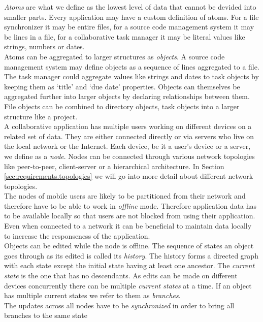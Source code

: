 \emph{Atoms} are what we define as the lowest level of data that cannot be devided into smaller parts.
Every application may have a custom definition of atoms.
For a file synchronizer it may be entire files, for a source code management system it may be lines in a file, for a collaborative task manager it may be literal values like strings, numbers or dates.\\
Atoms can be aggregated to larger structures as \emph{objects}.
A source code management system may define objects as a sequence of lines aggregated to a file.
The task manager could aggregate values like strings and dates to task objects by keeping them as `title' and `due date' properties.
Objects can themselves be aggregated further into larger objects by declaring relationships between them.
File objects can be combined to directory objects, task objects into a larger structure like a project.\\
A collaborative application has multiple users working on different devices on a related set of data.
They are either connected directly or via servers who live on the local network or the Internet.
Each device, be it a user's device or a server, we define as a \emph{node}.
Nodes can be connected through various network topologies like peer-to-peer, client-server or a hierarchical architecture.
In Section \ref{sec:requirements.topologies} we will go into more detail about different network topologies.\\
The nodes of mobile users are likely to be partitioned from their network and therefore have to be able to work in \emph{offline} mode.
Therefore application data has to be available locally so that users are not blocked from using their application.
Even when connected to a network it can be beneficial to maintain data locally to increase the responseness of the application.\\
Objects can be edited while the node is offline.
The sequence of states an object goes through as its edited is called its \emph{history}.
The history forms a directed graph with each state except the initial state having at least one ancestor.
The \emph{current state} is the one that has no descendants.
As edits can be made on different devices concurrently there can be multiple \emph{current states} at a time.
If an object has multiple current states we refer to them as \emph{branches}.\\
The updates across all nodes have to be \emph{synchronized} in order to bring all branches to the same state\\
